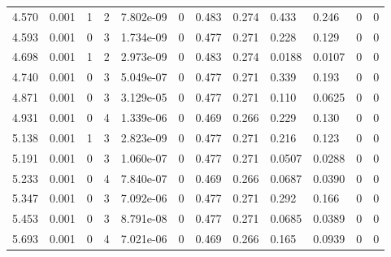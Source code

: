 \documentclass[preview]{standalone}
\begin{document}
{{\begin{tabular}{L{1.2cm}C{1.2cm} C{0.3cm}C{0.5cm} C{1.4cm}C{1.4cm} C{1.4cm}C{1.4cm} C{1.6cm}C{1.6cm} C{1.6cm}C{1.6cm}}
  4.570  &  0.001  & 1     &  2 &  7.802e-09  & 0  &  0.483&   0.274& 0.433 & 0.246   &  0 & 0  \\ 
  4.593  &  0.001  & 0     &  3 &  1.734e-09  & 0  &  0.477&   0.271& 0.228 & 0.129   &  0 & 0  \\ 
  4.698  &  0.001  & 1     &  2 &  2.973e-09  & 0  &  0.483&   0.274& 0.0188 & 0.0107   &  0 & 0  \\ 
  4.740  &  0.001  & 0     &  3 &  5.049e-07  & 0  &  0.477&   0.271& 0.339 & 0.193   &  0 & 0  \\ 
  4.871  &  0.001  & 0     &  3 &  3.129e-05  & 0  &  0.477&   0.271& 0.110 & 0.0625   &  0 & 0  \\ 
  4.931  &  0.001  & 0     &  4 &  1.339e-06  & 0  &  0.469&   0.266& 0.229 & 0.130   &  0 & 0  \\ 
  5.138  &  0.001  & 1     &  3 &  2.823e-09  & 0  &  0.477&   0.271& 0.216 & 0.123   &  0 & 0  \\ 
  5.191  &  0.001  & 0     &  3 &  1.060e-07  & 0  &  0.477&   0.271& 0.0507 & 0.0288   &  0 & 0  \\ 
  5.233  &  0.001  & 0     &  4 &  7.840e-07  & 0  &  0.469&   0.266& 0.0687 & 0.0390   &  0 & 0  \\ 
  5.347  &  0.001  & 0     &  3 &  7.092e-06  & 0  &  0.477&   0.271& 0.292 & 0.166   &  0 & 0  \\ 
  5.453  &  0.001  & 0     &  3 &  8.791e-08  & 0  &  0.477&   0.271& 0.0685 & 0.0389   &  0 & 0  \\ 
  5.693  &  0.001  & 0     &  4 &  7.021e-06  & 0  &  0.469&   0.266& 0.165 & 0.0939   &  0 & 0  \\ 
\hline 
\end{tabular} 

}}
\end{document}
